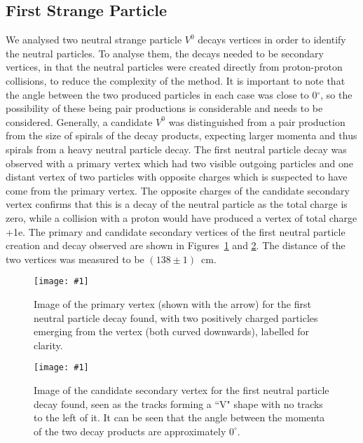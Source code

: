 \documentclass[twocolumn]{article}
\newcommand{\insertFigure}[1]{%
   \texttt{[image: \#1]}%
}
\begin{document}
\subsection{First Strange Particle}
We analysed two neutral strange particle $V^0$ decays vertices in order to identify the neutral particles. To analyse them, the decays needed to be secondary vertices, in that the neutral particles were created directly from proton-proton collisions, to reduce the complexity of the method. It is important to note that the angle between the two produced particles in each case was close to 0$^{\circ}$, so the possibility of these being pair productions is considerable and needs to be considered. Generally, a candidate $V^0$ was distinguished from a pair production from the size of spirals of the decay products, expecting larger momenta and thus spirals from a heavy neutral particle decay. The first neutral particle decay was observed with a primary vertex which had two visible outgoing particles and one distant vertex of two particles with opposite charges which is suspected to have come from the primary vertex. The opposite charges of the candidate secondary vertex confirms that this is a decay of the neutral particle as the total charge is zero, while a collision with a proton would have produced a vertex of total charge +1e. The primary and candidate secondary vertices of the first neutral particle creation and decay observed are shown in Figures~\ref{fig:strange1} and \ref{fig:strange1b}. The distance of the two vertices was measured to be $(138 \pm 1)$~cm. 
\begin{figure}[!h]
	\centering
	\insertFigure{Images/E212_v0_primary1.png}
	\caption{Image of the primary vertex (shown with the arrow) for the first neutral particle decay found, with two positively charged particles emerging from the vertex (both curved downwards), labelled for clarity.}
	\label{fig:strange1}
\end{figure}
\begin{figure}[!h]
	\centering
	\insertFigure{Images/E212_v01.png}
	\caption{Image of the candidate secondary vertex for the first neutral particle decay found, seen as the tracks forming a ``V" shape with no tracks to the left of it. It can be seen that the angle between the momenta of the two decay products are approximately $0^\circ$.}
	\label{fig:strange1b}
\end{figure}
\end{document}
